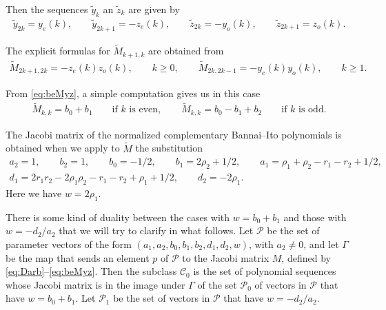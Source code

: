 \documentclass[10pt,a4paper]{amsart}
\def\cC{\mathcal C}
\def\cP{\mathcal P}
\numberwithin{equation}{section}
\begin{document}
Then the sequences $\tilde y_k$ an $\tilde z_k$ are given by
\begin{gather*}%
\tilde y_{2k}= y_e(k), \qquad \tilde y_{2k+1}= - z_e(k),\qquad
 \tilde z_{2k}= - y_o(k), \qquad \tilde	z_{2 k+1}= z_o(k).
\end{gather*}

The explicit formulas for $\tilde M_{k+1,k}$ are obtained from
\begin{gather*}%
 \tilde M_{2k+1,2k}= -z_e(k) z_o(k),\qquad  k\ge 0,\qquad
 \tilde M_{2k, 2k-1}= - y_e(k) y_o(k), \qquad  k\ge 1.
\end{gather*}

From \eqref{eq:beMyz}, a simple computation gives us in this case
\begin{gather*}%
	\tilde M_{k,k}= b_0+b_1 \qquad \text{if $k$ is even}, \qquad
	\tilde M_{k,k}= b_0-b_1+b_2 \qquad \text{if $k$ is odd}.
\end{gather*}

The Jacobi matrix of the normalized complementary Bannai--Ito polynomials is obtained when we apply to $\tilde M$ the substitution{\samepage
\begin{gather*}
a_2=1,\qquad b_2=1,\qquad b_0=-1/2,\qquad b_1=2 \rho_2+1/2,\qquad a_1=\rho_1+\rho_2-r_1-r_2+1/2, \\
 d_1=2 r_1 r_2 -2 \rho_1 \rho_2 -r_1-r_2+\rho_1+1/2,\qquad d_2=-2 \rho_1.
\end{gather*}
Here we have $w=2 \rho_1$.}


There is some kind of duality between the cases with $w=b_0+b_1$ and those with $w=-d_2/a_2$ that we will try to clarify in what follows.
Let $\cP$ be the set of parameter vectors of the form $(a_1, a_2, b_0, b_1, b_2, d_1,d_2,w)$, with $a_2\ne 0$, and let $\Gamma$ be the map that sends an element $p$ of $\cP$ to the Jacobi matrix $M$, defined by \eqref{eq:Darb}--\eqref{eq:beMyz}. Then the subclass $\cC_0$ is the set of polynomial sequences whose Jacobi matrix is in the image under $\Gamma$ of the set $\cP_0$ of vectors in $\cP$ that have $w=b_0+ b_1$. Let $\cP_1$ be the set of vectors in $\cP$ that have $w=-d_2/a_2$.
\end{document}

